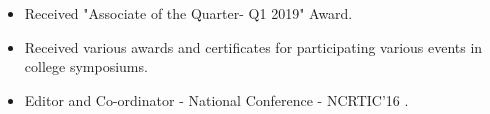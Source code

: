 

{}



\smallskip
\smallskip
\smallskip
{}
\smallskip
\smallskip
\smallskip
{}

\begin{itemize}
    \item Received "Associate of the Quarter- Q1 2019" Award.
    \item Received various awards and certificates for participating various events in college symposiums.
    \item Editor and Co-ordinator - National Conference - NCRTIC'16 .
\end{itemize}


\iffalse
\cvsection{Hobbies}
\begin{itemize}
    \item Watching movies.
    \item Listening songs.
    \item Playing games .
\end{itemize}
\fi






